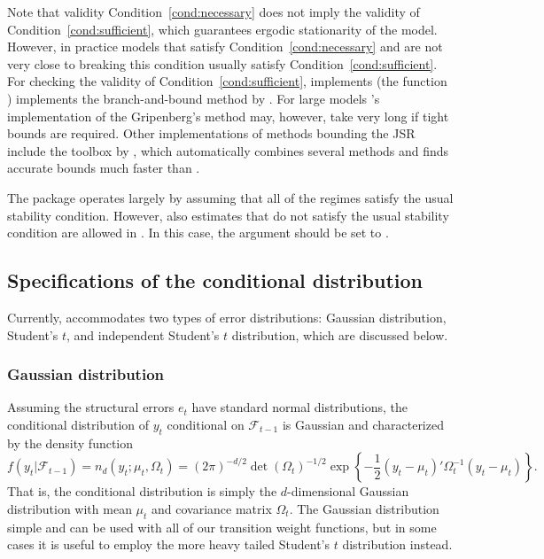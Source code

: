 \documentclass[nojss]{jss}
\begin{document}
Note that validity Condition~\ref{cond:necessary} does not imply the validity of Condition~\ref{cond:sufficient}, which guarantees ergodic stationarity of the model. However, in practice models that satisfy Condition~\ref{cond:necessary} and are not very close to breaking this condition usually satisfy Condition~\ref{cond:sufficient}. For checking the validity of Condition~\ref{cond:sufficient},  implements (the function ) implements the branch-and-bound method by \cite{Gripenberg:1996}. For large models 's implementation of the Gripenberg's method may, however, take very long if tight bounds are required. Other implementations of methods bounding the JSR include the  toolbox  by \cite{Jungers:2023}, which automatically combines several methods and finds accurate bounds much faster than .

The  package  operates largely by assuming that all of the regimes satisfy the usual stability condition. However, also estimates that do not satisfy the usual stability condition are allowed in . In this case, the argument  should be set to .


\subsection{Specifications of the conditional distribution}\label{sec:cond_dist}

Currently,  accommodates two types of error distributions: Gaussian distribution, Student's $t$, and independent Student's $t$ distribution, which are discussed below.

\subsubsection{Gaussian distribution}

Assuming the structural errors $e_t$ have standard normal distributions, the conditional distribution of $y_t$ conditional on $\mathcal{F}_{t-1}$ is Gaussian and characterized by the density function
\begin{equation}
f(y_t|\mathcal{F}_{t-1}) = n_d(y_t;\mu_{t},\Omega_{t})=(2\pi)^{-d/2}\det(\Omega_t)^{-1/2}\exp\left\lbrace -\frac{1}{2}(y_t - \mu_t)'\Omega_t^{-1}(y_t - \mu_t) \right\rbrace .
\end{equation}
That is, the conditional distribution is simply the $d$-dimensional Gaussian distribution with mean $\mu_t$ and covariance matrix $\Omega_t$. The Gaussian distribution simple and can be used with all of our transition weight functions, but in some cases it is useful to employ the more heavy tailed Student's $t$ distribution instead.
\end{document}
